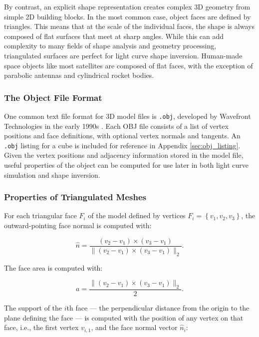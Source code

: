 By contrast, an explicit shape representation creates complex 3D geometry from simple 2D building blocks. In the most common case, object faces are defined by triangles. This means that at the scale of the individual faces, the shape is always composed of flat surfaces that meet at sharp angles. While this can add complexity to many fields of shape analysis and geometry processing, triangulated surfaces are perfect for light curve shape inversion. Human-made space objects like most satellites are composed of flat faces, with the exception of parabolic antennas and cylindrical rocket bodies.

\subsubsection{The Object File Format}

One common text file format for 3D model files is \texttt{.obj}, developed by Wavefront Technologies in the early 1990s \cite{obj_format}. Each OBJ file consists of a list of vertex positions and face definitions, with optional vertex normals and tangents. An \texttt{.obj} listing for a cube is included for reference in Appendix \ref{sec:obj_listing}. Given the vertex positions and adjacency information stored in the model file, useful properties of the object can be computed for use later in both light curve simulation and shape inversion. 

\subsubsection{Properties of Triangulated Meshes}

For each triangular face $F_i$ of the model defined by vertices $F_i = \left\{v_1, v_2, v_3\right\}$, the outward-pointing face normal is computed with:

\begin{equation} \label{eq:face_normal}
    \hat{n} = \frac{\left( v_2 - v_1 \right) \times \left( v_3 - v_1 \right)}{\| \left( v_2 - v_1 \right) \times \left( v_3 - v_1 \right) \|_2}.
\end{equation}

The face area is computed with:

\begin{equation} \label{eq:face_areas}
    a = \frac{\| \left( v_2 - v_1 \right) \times \left( v_3 - v_1 \right)\|_2}{2}.
\end{equation}

The support of the $i$th face --- the perpendicular distance from the origin to the plane defining the face --- is computed with the position of any vertex on that face, i.e., the first vertex $v_{i,1}$, and the face normal vector $\hat{n}_i$:

